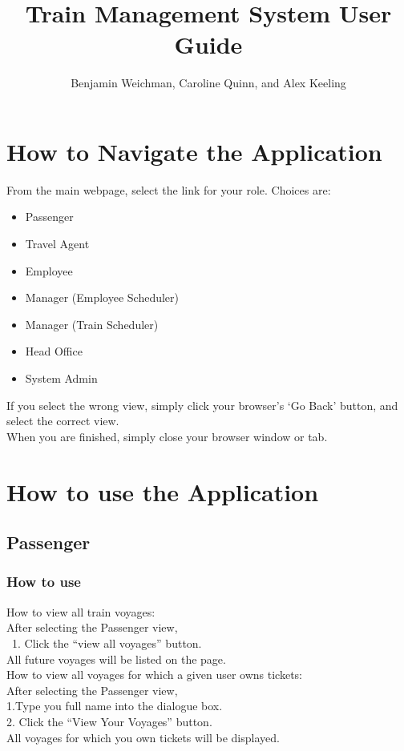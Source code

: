 \documentclass[letter]{article}
\title{Train Management System User Guide}
\author{Benjamin Weichman, Caroline Quinn, and Alex Keeling}
\date{}
\begin{document}
\maketitle

\section{How to Navigate the Application}
From the main webpage, select the link for your role. Choices are: 
\begin{itemize}
\item Passenger
\item Travel Agent
\item Employee
\item Manager (Employee Scheduler)
\item Manager (Train Scheduler)
\item Head Office
\item System Admin
\end{itemize}

If you select the wrong view, simply click your browser's `Go Back' button, and select the correct view. \\

When you are finished, simply close your browser window or tab.


\section{How to use the Application}

\subsection{Passenger}
\subsubsection{How to use}

How to view all train voyages:\\ 
After selecting the Passenger view,\\\
1. Click the “view all voyages” button.\\
All future voyages will be listed on the page.\\ 

How to view all voyages for which a given user owns tickets:\\
After selecting the Passenger view, \\
1.Type you full name into the dialogue box.\\
2. Click the “View Your Voyages” button.\\
All voyages for which you own tickets will be displayed. 
\end{document}
